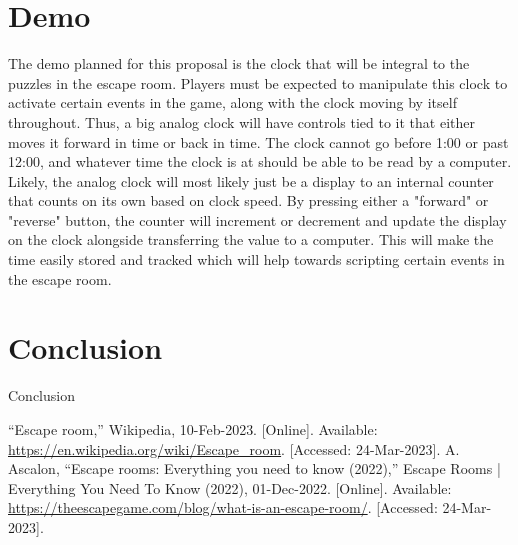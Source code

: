 \documentclass[conference]{IEEEtran}
\begin{document}
\section{Demo}
The demo planned for this proposal is the clock that will be integral to
the puzzles in the escape room. Players must be expected to manipulate
this clock to activate certain events in the game, along with the clock
moving by itself throughout. Thus, a big analog clock will have controls
tied to it that either moves it forward in time or back in time. The
clock cannot go before 1:00 or past 12:00, and whatever time the clock
is at should be able to be read by a computer.
\\
\indent Likely, the analog clock will most likely just be a display to an internal
counter that counts on its own based on clock speed. By pressing either a
"forward" or "reverse" button, the counter will increment or decrement
and update the display on the clock alongside transferring the value to
a computer. This will make the time easily stored and tracked which will
help towards scripting certain events in the escape room.

\section{Conclusion}
Conclusion

\begin{thebibliography}{00}

     “Escape room,” Wikipedia, 10-Feb-2023. [Online]. Available: \url{https://en.wikipedia.org/wiki/Escape_room}. [Accessed: 24-Mar-2023].
     A. Ascalon, “Escape rooms: Everything you need to know (2022),” Escape Rooms | Everything You Need To Know (2022), 01-Dec-2022. [Online]. Available:  \url{https://theescapegame.com/blog/what-is-an-escape-room/}. [Accessed: 24-Mar-2023].

\end{thebibliography}
\end{document}
